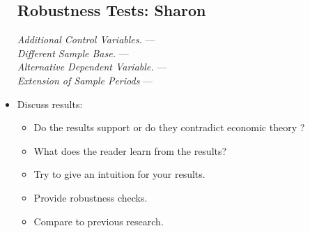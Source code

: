\begin{itemize}
\subsection{Robustness Tests: Sharon}
\textsl{Additional Control Variables.} ---
\\
\textsl{Different Sample Base.} ---
\\
\textsl{Alternative Dependent Variable.} ---
\\
\textsl{Extension of Sample Periods} ---
    \item Discuss results:
        \begin{itemize}
            \item Do the results support or do they contradict economic theory ?
            \item What does the reader learn from the results?
            \item Try to give an intuition for your results.
            \item Provide robustness checks.
            \item Compare to previous research.
        \end{itemize}
\end{itemize}
